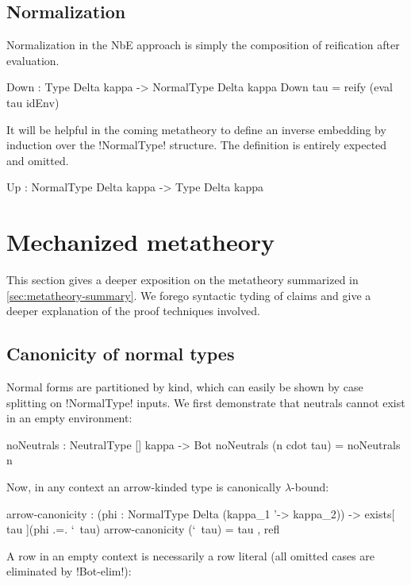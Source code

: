 \documentclass[sigplan,10pt,review]{acmart}\settopmatter{printfolios=true,printccs=false,printacmref=false}
\begin{document}
\subsection{Normalization}

Normalization in the NbE approach is simply the composition of reification after evaluation. 

\begin{agda} 
Down : Type Delta kappa -> NormalType Delta kappa
Down tau = reify (eval tau idEnv)
\end{agda}


It will be helpful in the coming metatheory to define an inverse embedding by induction over the !NormalType! structure. The definition is entirely expected and omitted. 

\begin{agda}
Up : NormalType Delta kappa -> Type Delta kappa
\end{agda}

\section{Mechanized metatheory}

This section gives a deeper exposition on the metatheory summarized in \cref{sec:metatheory-summary}. We forego syntactic tyding of claims and give a deeper explanation of the proof techniques involved.

\subsection{Canonicity of normal types}
Normal forms are partitioned by kind, which can easily be shown by case splitting on !NormalType! inputs. We first demonstrate that neutrals cannot exist in an empty environment:

\begin{agda} 
noNeutrals : NeutralType [] kappa -> Bot
noNeutrals (n cdot tau) = noNeutrals n
\end{agda} 

Now, in any context an arrow-kinded type is canonically $\lambda$-bound:
\begin{agda}
arrow-canonicity : (phi : NormalType Delta (kappa_1 '-> kappa_2)) -> 
                    exists[ tau ](phi .=. `\ tau)
arrow-canonicity (`\ tau) = tau , refl 
\end{agda}

\Ni A row in an empty context is necessarily a row literal (all omitted cases are eliminated by !Bot-elim!):
\end{document}
